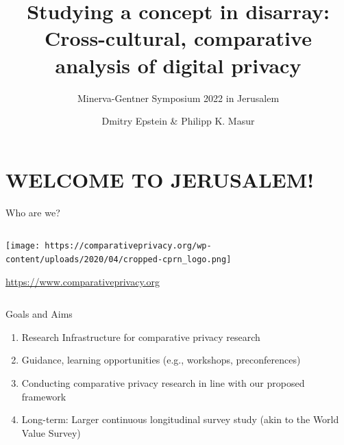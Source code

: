 \documentclass[
  ignorenonframetext,
]{beamer}
\title{Studying a concept in disarray: Cross-cultural, comparative
analysis of digital privacy}
\subtitle{Minerva-Gentner Symposium 2022 in Jerusalem}
\author{Dmitry Epstein \& Philipp K. Masur}
\date{}
\providecommand{\tightlist}{%
  \setlength{\itemsep}{0pt}\setlength{\parskip}{0pt}}\usepackage{longtable,booktabs,array}
\begin{document}
\frame{\titlepage}
\ifdefined\Shaded\renewenvironment{Shaded}{\begin{tcolorbox}[breakable, borderline west={3pt}{0pt}{shadecolor}, enhanced, sharp corners, interior hidden, boxrule=0pt, frame hidden]}{\end{tcolorbox}}\fi

\hypertarget{welcome-to-jerusalem}{%
\section{WELCOME TO JERUSALEM!}\label{welcome-to-jerusalem}}

\begin{frame}{Who are we?}
\protect\hypertarget{who-are-we}{}
\begin{column}{0.45\textwidth}
\texttt{[image: https://comparativeprivacy.org/wp-content/uploads/2020/04/cropped-cprn\_logo.png]}

\url{https://www.comparativeprivacy.org}
\end{column}

\begin{column}{0.05\textwidth}
\end{column}

\begin{column}{0.45\textwidth}
\begin{block}{Goals and Aims}
\protect\hypertarget{goals-and-aims}{}
\begin{enumerate}
\tightlist
\item
  Research Infrastructure for comparative privacy research
\item
  Guidance, learning opportunities (e.g., workshops, preconferences)
\item
  Conducting comparative privacy research in line with our proposed
  framework
\item
  Long-term: Larger continuous longitudinal survey study (akin to the
  World Value Survey)
\end{enumerate}
\end{block}
\end{column}
\end{frame}
\end{document}
